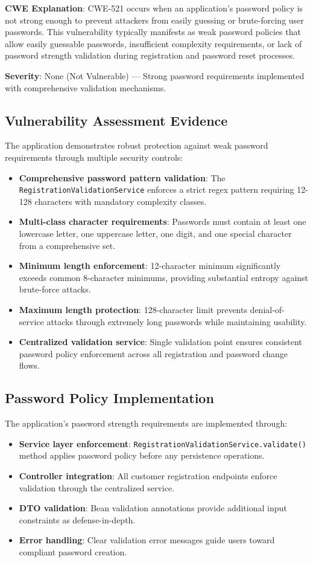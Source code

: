 \documentclass[]{UCD_CS_FYP_Report}
\begin{document}
\textbf{CWE Explanation}: CWE-521 occurs when an application's password policy is not strong enough to prevent attackers from easily guessing or brute-forcing user passwords. This vulnerability typically manifests as weak password policies that allow easily guessable passwords, insufficient complexity requirements, or lack of password strength validation during registration and password reset processes.

\textbf{Severity}: None (Not Vulnerable) — Strong password requirements implemented with comprehensive validation mechanisms.

\subsection{Vulnerability Assessment Evidence}
The application demonstrates robust protection against weak password requirements through multiple security controls:
\begin{itemize}
	\item \textbf{Comprehensive password pattern validation}: The \texttt{RegistrationValidationService} enforces a strict regex pattern requiring 12-128 characters with mandatory complexity classes.
	\item \textbf{Multi-class character requirements}: Passwords must contain at least one lowercase letter, one uppercase letter, one digit, and one special character from a comprehensive set.
	\item \textbf{Minimum length enforcement}: 12-character minimum significantly exceeds common 8-character minimums, providing substantial entropy against brute-force attacks.
	\item \textbf{Maximum length protection}: 128-character limit prevents denial-of-service attacks through extremely long passwords while maintaining usability.
	\item \textbf{Centralized validation service}: Single validation point ensures consistent password policy enforcement across all registration and password change flows.
\end{itemize}

\subsection{Password Policy Implementation}
The application's password strength requirements are implemented through:
\begin{itemize}
	\item \textbf{Service layer enforcement}: \texttt{RegistrationValidationService.validate()} method applies password policy before any persistence operations.
	\item \textbf{Controller integration}: All customer registration endpoints enforce validation through the centralized service.
	\item \textbf{DTO validation}: Bean validation annotations provide additional input constraints as defense-in-depth.
	\item \textbf{Error handling}: Clear validation error messages guide users toward compliant password creation.
\end{itemize}
\end{document}
